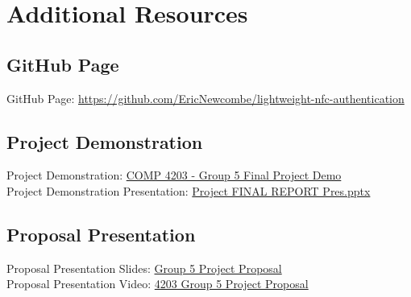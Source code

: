 \section{Additional Resources}

\subsection{GitHub Page}
GitHub Page: {\color{blue}\href{https://github.com/EricNewcombe/lightweight-nfc-authentication}{https://github.com/EricNewcombe/lightweight-nfc-authentication}}

\subsection{Project Demonstration}
Project Demonstration: {\color{blue}\href{https://www.youtube.com/watch?v=7CGCEju9k_4&ab_channel=KyleKno}{COMP 4203 - Group 5 Final Project Demo}}\\
Project Demonstration Presentation: {\color{blue}\href{https://drive.google.com/file/d/1XaMSUEic6h73LHT6Pn2JcByK-j4VYvJP/view?usp=sharing}{Project FINAL REPORT Pres.pptx
}}

\subsection{Proposal Presentation}
Proposal Presentation Slides: {\color{blue}\href{https://docs.google.com/presentation/d/1XaMSUEic6h73LHT6Pn2JcByK-j4VYvJP/edit}{Group 5 Project Proposal}}\\
Proposal Presentation Video: {\color{blue}\href{https://youtu.be/NOwZpC8iaG8}{4203 Group 5 Project Proposal}}
